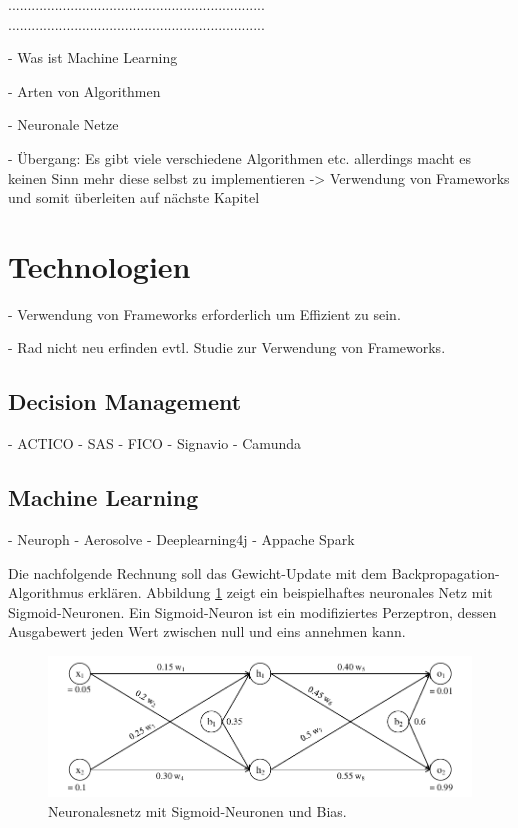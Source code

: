 ..................................................................
..................................................................

- Was ist Machine Learning

- Arten von Algorithmen 

- Neuronale Netze 

- Übergang: Es gibt viele verschiedene Algorithmen etc. allerdings macht es keinen Sinn mehr diese selbst zu implementieren -> Verwendung von Frameworks und somit überleiten auf nächste Kapitel

\section{Technologien}
\label{sec:Technologien2}

- Verwendung von Frameworks erforderlich um Effizient zu sein.

- Rad nicht neu erfinden evtl. Studie zur Verwendung von Frameworks.

\subsection{Decision Management}
\label{subsec:Decision_Management2}

- ACTICO 
- SAS
- FICO 
- Signavio
- Camunda

\subsection{Machine Learning}
\label{subsec:Machine_Learning2}

- Neuroph
- Aerosolve 
- Deeplearning4j
- Appache Spark

Die nachfolgende Rechnung soll das Gewicht-Update mit dem Backpropagation-Algorithmus erklären. Abbildung \ref{fig:perceptronNumberedSigmoid} zeigt ein beispielhaftes neuronales Netz mit Sigmoid-Neuronen. Ein Sigmoid-Neuron ist ein modifiziertes Perzeptron, dessen Ausgabewert jeden Wert zwischen null und eins annehmen kann. 

\begin{figure}[ht]
\centering
\includegraphics{images/perceptronNumberedSigmoid.pdf}
\caption{Neuronalesnetz mit Sigmoid-Neuronen und Bias.}
\label{fig:perceptronNumberedSigmoid}
\end{figure}

